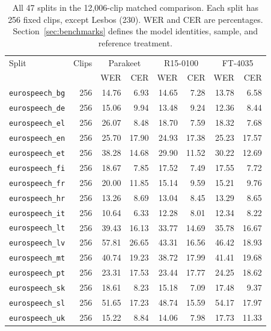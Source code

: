 \begin{table}[!ht]
\centering
\caption{All 47 splits in the 12,006-clip matched comparison. Each split has 256 fixed clips, except Lesbos (230). WER and CER are percentages. Section~\ref{sec:benchmarks} defines the model identities, sample, and reference treatment.}
\label{tab:sample-benchmark}
\footnotesize
\setlength{\tabcolsep}{3.4pt}
\renewcommand{\arraystretch}{1.08}
\begin{tabular}{lrrrrrrr}
\toprule
Split & Clips & \multicolumn{2}{c}{Parakeet} & \multicolumn{2}{c}{R15-0100} & \multicolumn{2}{c}{FT-4035}\\
 & & WER & CER & WER & CER & WER & CER\\
\midrule
\texttt{eurospeech\_bg} & 256 & 14.76 & 6.93 & 14.65 & 7.28 & 13.78 & 6.58\\
\texttt{eurospeech\_de} & 256 & 15.06 & 9.94 & 13.48 & 9.24 & 12.36 & 8.44\\
\texttt{eurospeech\_el} & 256 & 26.07 & 8.48 & 18.70 & 7.59 & 18.32 & 7.68\\
\texttt{eurospeech\_en} & 256 & 25.70 & 17.90 & 24.93 & 17.38 & 25.23 & 17.57\\
\texttt{eurospeech\_et} & 256 & 38.28 & 14.68 & 29.90 & 11.52 & 30.22 & 12.69\\
\texttt{eurospeech\_fi} & 256 & 18.67 & 7.85 & 17.52 & 7.49 & 17.55 & 7.72\\
\texttt{eurospeech\_fr} & 256 & 20.00 & 11.85 & 15.14 & 9.59 & 15.21 & 9.76\\
\texttt{eurospeech\_hr} & 256 & 13.26 & 8.69 & 13.04 & 8.45 & 13.29 & 8.65\\
\texttt{eurospeech\_it} & 256 & 10.64 & 6.33 & 12.28 & 8.01 & 12.34 & 8.22\\
\texttt{eurospeech\_lt} & 256 & 39.43 & 16.13 & 33.77 & 14.69 & 35.78 & 16.67\\
\texttt{eurospeech\_lv} & 256 & 57.81 & 26.65 & 43.31 & 16.56 & 46.42 & 18.93\\
\texttt{eurospeech\_mt} & 256 & 40.74 & 19.23 & 38.72 & 17.99 & 41.41 & 19.68\\
\texttt{eurospeech\_pt} & 256 & 23.31 & 17.53 & 23.44 & 17.77 & 24.25 & 18.62\\
\texttt{eurospeech\_sk} & 256 & 18.61 & 8.23 & 15.18 & 7.09 & 17.48 & 9.37\\
\texttt{eurospeech\_sl} & 256 & 51.65 & 17.23 & 48.74 & 15.59 & 54.17 & 17.97\\
\texttt{eurospeech\_uk} & 256 & 15.22 & 8.84 & 14.06 & 7.98 & 17.73 & 11.33\\

\end{tabular}
\end{table}
